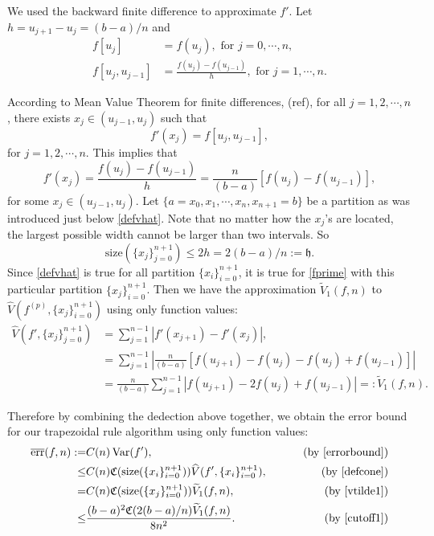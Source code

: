 \documentclass{iitthesis}
\DeclareMathOperator{\Var}{Var}
\theoremstyle{definition}
\theoremstyle{remark}
\begin{document}
We used the backward finite difference to approximate $f'$. Let $h=u_{j+1}-u_{j}=(b-a)/n$ and
\begin{align*}
  f[u_{j}]&=f(u_{j}), \text{ for } j=0,\cdots, n,\\
  f[u_{j},u_{j-1}]&=\frac{f(u_{j})-f(u_{j-1})}{h},\text{ for } j=1, \cdots, n.
\end{align*}


According to Mean Value Theorem for finite differences, (ref), for all $j=1,2,\cdots,n$, there exists $x_j\in (u_{j-1},u_{j})$ such that
\begin{equation*}
   f'(x_j)= f[u_{j},u_{j-1}],
\end{equation*}
for $j = 1, 2, \cdots, n.$ This implies that
\begin{equation}\label{fprime}
  f'(x_j)=\frac{f(u_{j})-f(u_{j-1})}{h}=\frac{n}{(b-a)}[f(u_{j})-f(u_{j-1})],
\end{equation}
for some $x_j\in (u_{j-1},u_{j})$. Let $\{a=x_{0}, x_{1},\cdots,x_{n},x_{n+1}=b\}$ be a partition as was introduced just below \eqref{defvhat}. Note that no matter how the $x_j$'s are located, the largest possible width cannot be larger than two intervals. So
\begin{equation}\label{cutoff1}
  \text{size}(\{x_j\}_{j=0}^{n+1})\leq 2h=2(b-a)/n:=\mathfrak{h}.
\end{equation}
Since \eqref{defvhat} is true for all partition $\{x_i\}_{i=0}^{n+1}$, it is true for \eqref{fprime} with this particular partition $\{x_j\}_{i=0}^{n+1}$. Then we have the approximation $\widetilde{V}_1(f,n)$ to $\widehat{V}(f^{(p)},\{x_j\}_{i=0}^{n+1})$ using only function values:
\begin{align}\label{vtilde1}
\nonumber    \widehat{V}(f',\{x_j\}_{j=0}^{n+1})&= \sum_{j=1}^{n-1}\left|f'(x_{j+1})-f'(x_{j})\right|,\\
\nonumber    &=\sum_{j=1}^{n-1}\left|\frac{n}{(b-a)}[f(u_{j+1})-f(u_{j})-f(u_{j})+f(u_{j-1})]\right|\\
    &=\frac{n}{(b-a)}\sum_{j=1}^{n-1}\left|f(u_{j+1})-2f(u_{j})+f(u_{j-1})\right|=:\widetilde{V}_1(f,n).
\end{align}

Therefore by combining the dedection above together, we obtain the error bound for our trapezoidal rule algorithm using only function values:
\begin{align}\label{errortrapcone}
\nonumber  \overline{\text{err}}(f,n):=&C(n)\Var(f'),\qquad &\text{ (by \eqref{errorbound})}\\
\nonumber  \leq & C(n)\mathfrak{C}(\text{size}(\{x_i\}_{i=0}^{n+1}))\widehat{V}(f',\{x_i\}_{i=0}^{n+1}), \qquad &\text{ (by \eqref{defcone})}\\
\nonumber  =& C(n)\mathfrak{C}(\text{size}(\{x_j\}_{i=0}^{n+1}))\widetilde{V}_1(f,n), \qquad &\text{ (by \eqref{vtilde1})}\\
  \leq & \frac{(b-a)^2\mathfrak{C}(2(b-a)/n)\widetilde{V}_1(f,n)}{8n^2}.\qquad &\text{ (by \eqref{cutoff1})}
\end{align}
\end{document}
